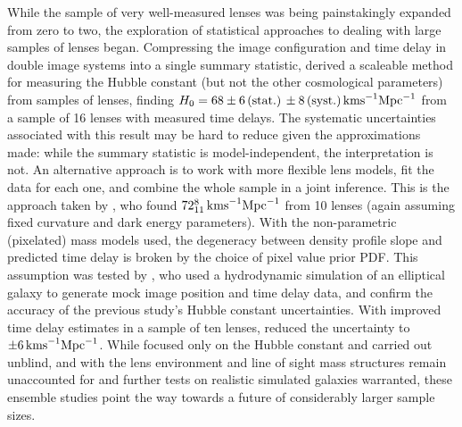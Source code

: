 While the sample of very well-measured lenses was being painstakingly
expanded from zero to two, the exploration of statistical approaches to
dealing with large samples of lenses began.  Compressing the image
configuration and time delay in double image systems into a single
summary statistic, \citet{Ogu07b} derived a scaleable  method for
measuring the Hubble constant (but not the other cosmological
parameters) from samples of lenses, finding
$H_0=68\pm6\,{\rm(stat.)}\,\pm8\,{\rm (syst.)}\,{\rm km s}^{-1}{\rm
Mpc}^{-1}$ from a sample of 16 lenses with measured time delays. The
systematic uncertainties associated with this result may be hard to
reduce given the approximations made: while the summary statistic is
model-independent, the  interpretation is not. An alternative approach
is to work with more flexible lens models, fit the data for each one,
and combine the whole sample in a joint inference.  This is the approach
taken by \citet{Sah++06}, who found  $72^{8}_{11}\,{\rm km s}^{-1}{\rm
Mpc}^{-1}$ from 10 lenses (again assuming fixed curvature and dark energy
parameters). With the  non-parametric (pixelated) mass
models used, the degeneracy between  density profile slope and predicted
time delay is broken by the choice  of pixel value prior PDF. This assumption was
tested by \citet{Rea++07}, who used a hydrodynamic simulation of an
elliptical galaxy to generate mock image position and time delay data,
and confirm the accuracy of the previous study's Hubble constant
uncertainties. With improved time delay estimates in a sample
of ten lenses, \citet{RK++2015} reduced the uncertainty to
$\pm6\,{\rm km s}^{-1}{\rm Mpc}^{-1}$. While focused only on the
Hubble constant and carried out unblind, and with the lens environment and
line of sight mass structures remain unaccounted for and further tests
on realistic simulated galaxies warranted, these ensemble studies
point the way towards a future of considerably larger sample sizes.
